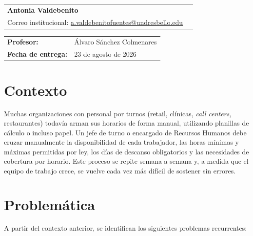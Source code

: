 \documentclass[11pt,letterpaper]{article}
\begin{document}
\begin{titlepage}
\begin{minipage}{0.85\textwidth}
\begin{tabular}{l l}
            \textbf{Antonia Valdebenito}      & \\[-0.1cm]
            \small Correo institucional: \href{mailto:a.valdebenitofuentes@undresbello.edu}{a.valdebenitofuentes@undresbello.edu} &  \\[0.4cm]
        \end{tabular}
    \end{minipage}

    \vfill

    \begin{tabular}{ll}
        \textbf{Profesor:} & Álvaro Sánchez Colmenares \\[0.2cm]
        \textbf{Fecha de entrega:} & 23 de agosto de 2026 \\
    \end{tabular}

    \vspace{1cm}
\end{titlepage}

\tableofcontents
\newpage

\section{Contexto}

Muchas organizaciones con personal por turnos (retail, clínicas, \textit{call centers}, restaurantes) todavía arman sus horarios de forma manual, utilizando planillas de cálculo o incluso papel. Un jefe de turno o encargado de Recursos Humanos debe cruzar manualmente la disponibilidad de cada trabajador, las horas mínimas y máximas permitidas por ley, los días de descanso obligatorios y las necesidades de cobertura por horario. Este proceso se repite semana a semana y, a medida que el equipo de trabajo crece, se vuelve cada vez más difícil de sostener sin errores.

\section{Problemática}

A partir del contexto anterior, se identifican los siguientes problemas recurrentes:
\end{document}
